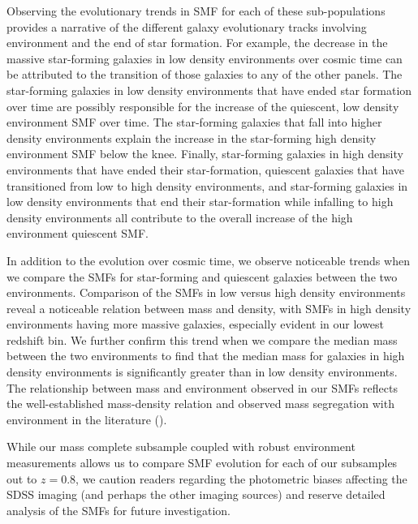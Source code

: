 Observing the evolutionary trends in SMF for each of these
sub-populations provides a narrative of the different galaxy
evolutionary tracks involving environment and the end of star
formation. For example, the decrease in the massive star-forming
galaxies in low density environments over cosmic time can be
attributed to the transition of those galaxies to any of the other
panels. The star-forming galaxies in low density environments that
have ended star formation over time are possibly responsible
for the increase of the quiescent, low density environment SMF over
time. The star-forming galaxies that fall into higher density
environments explain the increase in the star-forming high density
environment SMF below the knee. Finally, star-forming galaxies in high
density environments that have ended their star-formation,
quiescent galaxies that have transitioned from low to high density
environments, and star-forming galaxies in low density environments
that end their star-formation while infalling to high density
environments all contribute to the overall increase of the high
environment quiescent SMF.

In addition to the evolution over cosmic time, we observe noticeable
trends when we compare the SMFs for star-forming and quiescent
galaxies between the two environments. Comparison of the SMFs in low
versus high density environments reveal a noticeable relation between
mass and density, with SMFs in high density environments having more
massive galaxies, especially evident in our lowest redshift bin. 
We further confirm this trend when we compare the
median mass between the two environments to find that the median mass
for galaxies in high density environments is significantly greater
than in low density environments. The relationship between mass and
environment observed in our SMFs reflects the well-established
mass-density relation and observed mass segregation with environment
in the literature (\citealt{norberg02a, zehavi02a, Blanton:2005ab,
  bundy06a, Scodeggio:2009aa, Bolzonella:2010aa}).

While our mass complete subsample coupled with robust environment
measurements allows us to compare SMF evolution for each of our
subsamples out to $z=0.8$, we caution readers regarding the
photometric biases affecting the SDSS imaging (and perhaps the other
imaging sources) and reserve detailed analysis of the SMFs for 
future investigation.

